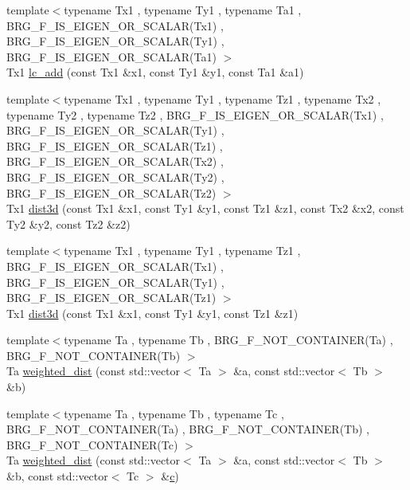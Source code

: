 \begin{DoxyCompactItemize}
{\footnotesize template$<$typename Tx1 , typename Ty1 , typename Ta1 , B\+R\+G\+\_\+\+F\+\_\+\+I\+S\+\_\+\+E\+I\+G\+E\+N\+\_\+\+O\+R\+\_\+\+S\+C\+A\+L\+A\+R(\+Tx1) , B\+R\+G\+\_\+\+F\+\_\+\+I\+S\+\_\+\+E\+I\+G\+E\+N\+\_\+\+O\+R\+\_\+\+S\+C\+A\+L\+A\+R(\+Ty1) , B\+R\+G\+\_\+\+F\+\_\+\+I\+S\+\_\+\+E\+I\+G\+E\+N\+\_\+\+O\+R\+\_\+\+S\+C\+A\+L\+A\+R(\+Ta1) $>$ }\\Tx1 \hyperlink{namespaceIceBRG_a9c4d1ff1aaf95513be4b6202bcbfe96a}{lc\+\_\+add} (const Tx1 \&x1, const Ty1 \&y1, const Ta1 \&a1)
\item 
{\footnotesize template$<$typename Tx1 , typename Ty1 , typename Tz1 , typename Tx2 , typename Ty2 , typename Tz2 , B\+R\+G\+\_\+\+F\+\_\+\+I\+S\+\_\+\+E\+I\+G\+E\+N\+\_\+\+O\+R\+\_\+\+S\+C\+A\+L\+A\+R(\+Tx1) , B\+R\+G\+\_\+\+F\+\_\+\+I\+S\+\_\+\+E\+I\+G\+E\+N\+\_\+\+O\+R\+\_\+\+S\+C\+A\+L\+A\+R(\+Ty1) , B\+R\+G\+\_\+\+F\+\_\+\+I\+S\+\_\+\+E\+I\+G\+E\+N\+\_\+\+O\+R\+\_\+\+S\+C\+A\+L\+A\+R(\+Tz1) , B\+R\+G\+\_\+\+F\+\_\+\+I\+S\+\_\+\+E\+I\+G\+E\+N\+\_\+\+O\+R\+\_\+\+S\+C\+A\+L\+A\+R(\+Tx2) , B\+R\+G\+\_\+\+F\+\_\+\+I\+S\+\_\+\+E\+I\+G\+E\+N\+\_\+\+O\+R\+\_\+\+S\+C\+A\+L\+A\+R(\+Ty2) , B\+R\+G\+\_\+\+F\+\_\+\+I\+S\+\_\+\+E\+I\+G\+E\+N\+\_\+\+O\+R\+\_\+\+S\+C\+A\+L\+A\+R(\+Tz2) $>$ }\\Tx1 \hyperlink{namespaceIceBRG_ad7d8ac9fe85a6b6c56aeac3069587606}{dist3d} (const Tx1 \&x1, const Ty1 \&y1, const Tz1 \&z1, const Tx2 \&x2, const Ty2 \&y2, const Tz2 \&z2)
\item 
{\footnotesize template$<$typename Tx1 , typename Ty1 , typename Tz1 , B\+R\+G\+\_\+\+F\+\_\+\+I\+S\+\_\+\+E\+I\+G\+E\+N\+\_\+\+O\+R\+\_\+\+S\+C\+A\+L\+A\+R(\+Tx1) , B\+R\+G\+\_\+\+F\+\_\+\+I\+S\+\_\+\+E\+I\+G\+E\+N\+\_\+\+O\+R\+\_\+\+S\+C\+A\+L\+A\+R(\+Ty1) , B\+R\+G\+\_\+\+F\+\_\+\+I\+S\+\_\+\+E\+I\+G\+E\+N\+\_\+\+O\+R\+\_\+\+S\+C\+A\+L\+A\+R(\+Tz1) $>$ }\\Tx1 \hyperlink{namespaceIceBRG_af0eb3c0dd713f6176fb1d7689b6db021}{dist3d} (const Tx1 \&x1, const Ty1 \&y1, const Tz1 \&z1)
\item 
{\footnotesize template$<$typename Ta , typename Tb , B\+R\+G\+\_\+\+F\+\_\+\+N\+O\+T\+\_\+\+C\+O\+N\+T\+A\+I\+N\+E\+R(\+Ta) , B\+R\+G\+\_\+\+F\+\_\+\+N\+O\+T\+\_\+\+C\+O\+N\+T\+A\+I\+N\+E\+R(\+Tb) $>$ }\\Ta \hyperlink{namespaceIceBRG_a80fff1ca77a46f0d13cb68c2486ed172}{weighted\+\_\+dist} (const std\+::vector$<$ Ta $>$ \&a, const std\+::vector$<$ Tb $>$ \&b)
\item 
{\footnotesize template$<$typename Ta , typename Tb , typename Tc , B\+R\+G\+\_\+\+F\+\_\+\+N\+O\+T\+\_\+\+C\+O\+N\+T\+A\+I\+N\+E\+R(\+Ta) , B\+R\+G\+\_\+\+F\+\_\+\+N\+O\+T\+\_\+\+C\+O\+N\+T\+A\+I\+N\+E\+R(\+Tb) , B\+R\+G\+\_\+\+F\+\_\+\+N\+O\+T\+\_\+\+C\+O\+N\+T\+A\+I\+N\+E\+R(\+Tc) $>$ }\\Ta \hyperlink{namespaceIceBRG_a6fc01772c041b44d2db3e85d6f350459}{weighted\+\_\+dist} (const std\+::vector$<$ Ta $>$ \&a, const std\+::vector$<$ Tb $>$ \&b, const std\+::vector$<$ Tc $>$ \&\hyperlink{namespaceIceBRG_a064ef8d17408ee9f2c81f8aa1f87155e}{c})

\end{DoxyCompactItemize}
